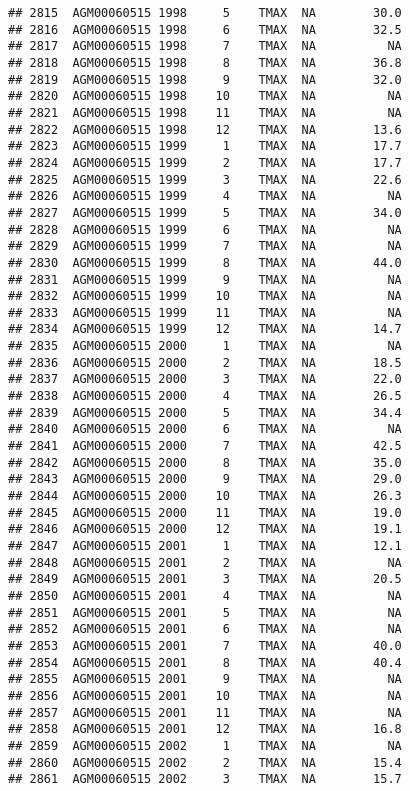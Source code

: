 \documentclass{article}\usepackage[]{graphicx}\usepackage[]{color}
\makeatletter
\newenvironment{kframe}{%
 \def\at@end@of@kframe{}%
 \ifinner\ifhmode%
  \def\at@end@of@kframe{\end{minipage}}%
  \begin{minipage}{\columnwidth}%
 \fi\fi%
 \def\FrameCommand##1{\hskip\@totalleftmargin \hskip-\fboxsep
 \colorbox{shadecolor}{##1}\hskip-\fboxsep
     \hskip-\linewidth \hskip-\@totalleftmargin \hskip\columnwidth}%
 \MakeFramed {\advance\hsize-\width
   \@totalleftmargin\z@ \linewidth\hsize
   \@setminipage}}%
 {\par\unskip\endMakeFramed%
 \at@end@of@kframe}
\newenvironment{knitrout}{}{} %
\makeatother
\begin{document}
\begin{knitrout}
\begin{kframe}
\begin{verbatim}
## 2815  AGM00060515 1998     5    TMAX  NA        30.0
## 2816  AGM00060515 1998     6    TMAX  NA        32.5
## 2817  AGM00060515 1998     7    TMAX  NA          NA
## 2818  AGM00060515 1998     8    TMAX  NA        36.8
## 2819  AGM00060515 1998     9    TMAX  NA        32.0
## 2820  AGM00060515 1998    10    TMAX  NA          NA
## 2821  AGM00060515 1998    11    TMAX  NA          NA
## 2822  AGM00060515 1998    12    TMAX  NA        13.6
## 2823  AGM00060515 1999     1    TMAX  NA        17.7
## 2824  AGM00060515 1999     2    TMAX  NA        17.7
## 2825  AGM00060515 1999     3    TMAX  NA        22.6
## 2826  AGM00060515 1999     4    TMAX  NA          NA
## 2827  AGM00060515 1999     5    TMAX  NA        34.0
## 2828  AGM00060515 1999     6    TMAX  NA          NA
## 2829  AGM00060515 1999     7    TMAX  NA          NA
## 2830  AGM00060515 1999     8    TMAX  NA        44.0
## 2831  AGM00060515 1999     9    TMAX  NA          NA
## 2832  AGM00060515 1999    10    TMAX  NA          NA
## 2833  AGM00060515 1999    11    TMAX  NA          NA
## 2834  AGM00060515 1999    12    TMAX  NA        14.7
## 2835  AGM00060515 2000     1    TMAX  NA          NA
## 2836  AGM00060515 2000     2    TMAX  NA        18.5
## 2837  AGM00060515 2000     3    TMAX  NA        22.0
## 2838  AGM00060515 2000     4    TMAX  NA        26.5
## 2839  AGM00060515 2000     5    TMAX  NA        34.4
## 2840  AGM00060515 2000     6    TMAX  NA          NA
## 2841  AGM00060515 2000     7    TMAX  NA        42.5
## 2842  AGM00060515 2000     8    TMAX  NA        35.0
## 2843  AGM00060515 2000     9    TMAX  NA        29.0
## 2844  AGM00060515 2000    10    TMAX  NA        26.3
## 2845  AGM00060515 2000    11    TMAX  NA        19.0
## 2846  AGM00060515 2000    12    TMAX  NA        19.1
## 2847  AGM00060515 2001     1    TMAX  NA        12.1
## 2848  AGM00060515 2001     2    TMAX  NA          NA
## 2849  AGM00060515 2001     3    TMAX  NA        20.5
## 2850  AGM00060515 2001     4    TMAX  NA          NA
## 2851  AGM00060515 2001     5    TMAX  NA          NA
## 2852  AGM00060515 2001     6    TMAX  NA          NA
## 2853  AGM00060515 2001     7    TMAX  NA        40.0
## 2854  AGM00060515 2001     8    TMAX  NA        40.4
## 2855  AGM00060515 2001     9    TMAX  NA          NA
## 2856  AGM00060515 2001    10    TMAX  NA          NA
## 2857  AGM00060515 2001    11    TMAX  NA          NA
## 2858  AGM00060515 2001    12    TMAX  NA        16.8
## 2859  AGM00060515 2002     1    TMAX  NA          NA
## 2860  AGM00060515 2002     2    TMAX  NA        15.4
## 2861  AGM00060515 2002     3    TMAX  NA        15.7

\end{verbatim}
\end{kframe}
\end{knitrout}
\end{document}
